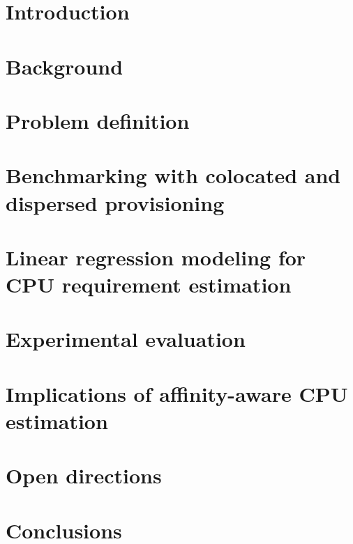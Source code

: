 
\section{Introduction}
\label{sec:arescue-intro}


\section{Background}
\label{sec:arescue-background}  

\section{Problem definition}
\label{sec:arescue-problem}


\section{Benchmarking with colocated and dispersed provisioning}
\label{sec:arescue-benchmark}


\section{Linear regression modeling for CPU requirement estimation}
\label{sec:arescue-our-approach}


\section{Experimental evaluation}
\label{sec:arescue-experimental-eval}


%

\section{Implications of affinity-aware CPU estimation}
\label{sec:arescue-related-work} 



\section{Open directions}
\label{sec:arescue-open-directions}


\section{Conclusions}
\label{sec:arescue-conclusions}

